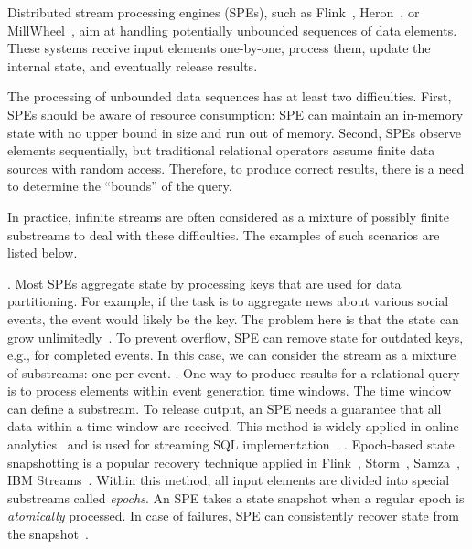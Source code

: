 \label {fs-acker-intro}

Distributed stream processing engines (SPEs), such as Flink~\cite{carbone2015apache}, Heron~\cite{Kulkarni:2015:THS:2723372.2742788}, or MillWheel~\cite{Akidau:2013:MFS:2536222.2536229}, aim at handling potentially unbounded sequences of data elements. These systems receive input elements one-by-one, process them, update the internal state, and eventually release results. 

The processing of unbounded data sequences has at least two difficulties. First, SPEs should be aware of resource consumption: SPE can maintain an in-memory state with no upper bound in size and run out of memory. Second, SPEs observe elements sequentially, but traditional relational operators assume finite data sources with random access. Therefore, to produce correct results, there is a need to determine the ``bounds'' of the query.

In practice, infinite streams are often considered as a mixture of possibly finite substreams to deal with these difficulties. The examples of such scenarios are listed below.

. Most SPEs aggregate state by processing keys that are used for data partitioning. For example, if the task is to aggregate news about various social events, the event would likely be the key. The problem here is that the state can grow unlimitedly~\cite{Tucker:2003:EPS:776752.776780}. To prevent overflow, SPE can remove state for outdated keys, e.g., for completed events. In this case, we can consider the stream as a mixture of substreams: one per event.  
. One way to produce results for a relational query is to process elements within event generation time windows. The time window can define a substream. To release output, an SPE needs a guarantee that all data within a time window are received. This method is widely applied in online analytics~\cite{traub2018scotty} and is used for streaming SQL implementation~\cite{Begoli:2019:OSR:3299869.3314040}.
. Epoch-based state snapshotting is a popular recovery technique applied in Flink~\cite{Carbone:2017:SMA:3137765.3137777}, Storm~\cite{Toshniwal:2014:STO:2588555.2595641}, Samza~\cite{Noghabi:2017:SSS:3137765.3137770}, IBM Streams~\cite{jacques2016consistent}. Within this method, all input elements are divided into special substreams called {\em epochs}. An SPE takes a state snapshot when a regular epoch is {\em atomically} processed. In case of failures, SPE can consistently recover state from the snapshot~\cite{2015arXiv150608603C}. 


